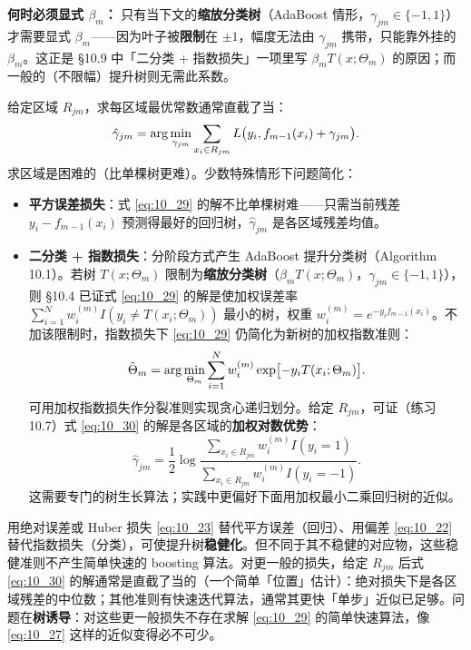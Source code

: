 \textbf{何时必须显式 $\beta_m$：} 只有当下文的\textbf{缩放分类树}（AdaBoost 情形，$\gamma_{jm} \in \{-1, 1\}$）才需要显式 $\beta_m$——因为叶子被\textbf{限制}在 $\pm 1$，幅度无法由 $\gamma_{jm}$ 携带，只能靠外挂的 $\beta_m$。这正是 §10.9 中「二分类 + 指数损失」一项里写 $\beta_m T(x;\Theta_m)$ 的原因；而一般的（不限幅）提升树则无需此系数。

给定区域 $R_{jm}$，求每区域最优常数通常直截了当：
\begin{equation}\label{eq:10_30}
    \hat\gamma_{jm} = \arg\min_{\gamma_{jm}} \sum_{x_i \in R_{jm}} L\bigl(y_i, f_{m-1}(x_i) + \gamma_{jm}\bigr).
\end{equation}
求区域是困难的（比单棵树更难）。少数特殊情形下问题简化：
\begin{itemize}
    \item \textbf{平方误差损失}：式 \eqref{eq:10_29} 的解不比单棵树难——只需当前残差 $y_i - f_{m-1}(x_i)$ 预测得最好的回归树，$\hat\gamma_{jm}$ 是各区域残差均值。
    \item \textbf{二分类 + 指数损失}：分阶段方式产生 AdaBoost 提升分类树（Algorithm 10.1）。若树 $T(x;\Theta_m)$ 限制为\textbf{缩放分类树}（$\beta_m T(x;\Theta_m)$，$\gamma_{jm} \in \{-1, 1\}$），则 §10.4 已证式 \eqref{eq:10_29} 的解是使加权误差率 $\sum_{i=1}^{N} w_i^{(m)} I(y_i \neq T(x_i;\Theta_m))$ 最小的树，权重 $w_i^{(m)} = e^{-y_i f_{m-1}(x_i)}$。不加该限制时，指数损失下 \eqref{eq:10_29} 仍简化为新树的加权指数准则：
    \begin{equation}\label{eq:10_31}
        \hat\Theta_m = \arg\min_{\Theta_m} \sum_{i=1}^{N} w_i^{(m)} \exp\bigl[-y_i T(x_i; \Theta_m)\bigr].
    \end{equation}
    可用加权指数损失作分裂准则实现贪心递归划分。给定 $R_{jm}$，可证（练习 10.7）式 \eqref{eq:10_30} 的解是各区域的\textbf{加权对数优势}：
    \begin{equation}\label{eq:10_32}
        \hat\gamma_{jm} = \frac{1}{2}\log\frac{\sum_{x_i \in R_{jm}} w_i^{(m)} I(y_i = 1)}{\sum_{x_i \in R_{jm}} w_i^{(m)} I(y_i = -1)}.
    \end{equation}
    这需要专门的树生长算法；实践中更偏好下面用加权最小二乘回归树的近似。
\end{itemize}

用绝对误差或 Huber 损失 \eqref{eq:10_23} 替代平方误差（回归）、用偏差 \eqref{eq:10_22} 替代指数损失（分类），可使提升树\textbf{稳健化}。但不同于其不稳健的对应物，这些稳健准则不产生简单快速的 boosting 算法。对更一般的损失，给定 $R_{jm}$ 后式 \eqref{eq:10_30} 的解通常是直截了当的（一个简单「位置」估计）：绝对损失下是各区域残差的中位数；其他准则有快速迭代算法，通常其更快「单步」近似已足够。问题在\textbf{树诱导}：对这些更一般损失不存在求解 \eqref{eq:10_29} 的简单快速算法，像 \eqref{eq:10_27} 这样的近似变得必不可少。

